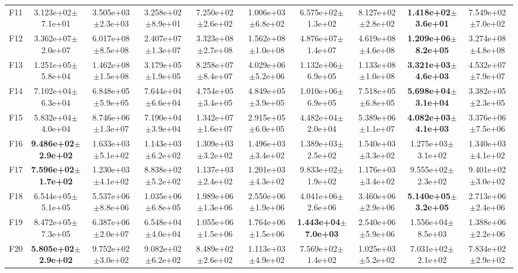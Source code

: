 \begin{table}[t]
\begin{tabular}{cccccccccc}
F11 & 3.123e+02$\pm$7.1e+01 & 3.505e+03$\pm$2.3e+03 & 3.258e+02$\pm$8.9e+01 & 7.250e+02$\pm$2.6e+02 & 1.006e+03$\pm$6.8e+02 & 6.575e+02$\pm$1.3e+02 & 8.127e+02$\pm$2.8e+02 & \textbf{1.418e+02$\pm$3.6e+01} & 7.549e+02$\pm$7.0e+02 \\
F12 & 3.362e+07$\pm$2.0e+07 & 6.017e+08$\pm$8.5e+08 & 2.407e+07$\pm$1.3e+07 & 3.323e+08$\pm$2.7e+08 & 1.562e+08$\pm$1.0e+08 & 4.876e+07$\pm$1.4e+07 & 4.619e+08$\pm$4.6e+08 & \textbf{1.209e+06$\pm$8.2e+05} & 3.274e+08$\pm$4.8e+08 \\
F13 & 1.251e+05$\pm$5.8e+04 & 1.462e+08$\pm$1.5e+08 & 3.179e+05$\pm$1.9e+05 & 8.258e+07$\pm$8.4e+07 & 4.029e+06$\pm$5.2e+06 & 1.132e+06$\pm$6.9e+05 & 1.133e+08$\pm$1.0e+08 & \textbf{3.321e+03$\pm$4.6e+03} & 4.532e+07$\pm$7.9e+07 \\
F14 & 7.102e+04$\pm$6.3e+04 & 6.848e+05$\pm$5.9e+05 & 7.644e+04$\pm$6.6e+04 & 4.754e+05$\pm$3.4e+05 & 4.849e+05$\pm$3.9e+05 & 1.010e+06$\pm$6.9e+05 & 7.518e+05$\pm$6.8e+05 & \textbf{5.698e+04$\pm$3.1e+04} & 3.382e+05$\pm$2.3e+05 \\
F15 & 5.832e+04$\pm$4.0e+04 & 8.746e+06$\pm$1.3e+07 & 7.190e+04$\pm$3.9e+04 & 1.342e+07$\pm$1.6e+07 & 2.915e+05$\pm$6.0e+05 & 4.482e+04$\pm$2.0e+04 & 5.389e+06$\pm$1.1e+07 & \textbf{4.082e+03$\pm$4.1e+03} & 3.376e+06$\pm$7.5e+06 \\
F16 & \textbf{9.486e+02$\pm$2.9e+02} & 1.633e+03$\pm$5.1e+02 & 1.143e+03$\pm$6.2e+02 & 1.309e+03$\pm$3.2e+02 & 1.496e+03$\pm$3.4e+02 & 1.389e+03$\pm$2.5e+02 & 1.540e+03$\pm$3.3e+02 & 1.275e+03$\pm$3.1e+02 & 1.340e+03$\pm$4.1e+02 \\
F17 & \textbf{7.596e+02$\pm$1.7e+02} & 1.230e+03$\pm$4.1e+02 & 8.838e+02$\pm$5.2e+02 & 1.137e+03$\pm$2.4e+02 & 1.201e+03$\pm$4.3e+02 & 9.833e+02$\pm$1.9e+02 & 1.176e+03$\pm$3.4e+02 & 9.555e+02$\pm$2.3e+02 & 9.401e+02$\pm$3.0e+02 \\
F18 & 6.544e+05$\pm$5.1e+05 & 5.537e+06$\pm$8.8e+06 & 1.035e+06$\pm$6.8e+05 & 1.989e+06$\pm$1.3e+06 & 2.550e+06$\pm$1.9e+06 & 4.041e+06$\pm$2.6e+06 & 3.460e+06$\pm$2.9e+06 & \textbf{5.140e+05$\pm$3.2e+05} & 2.713e+06$\pm$2.4e+06 \\
F19 & 8.472e+05$\pm$7.3e+05 & 6.387e+06$\pm$2.0e+07 & 6.548e+04$\pm$4.0e+04 & 1.055e+06$\pm$1.5e+06 & 1.764e+06$\pm$1.5e+06 & \textbf{1.443e+04$\pm$7.0e+03} & 2.540e+06$\pm$5.9e+06 & 1.556e+04$\pm$8.5e+03 & 1.388e+06$\pm$2.2e+06 \\
F20 & \textbf{5.805e+02$\pm$2.9e+02} & 9.752e+02$\pm$3.0e+02 & 9.082e+02$\pm$6.2e+02 & 8.489e+02$\pm$2.6e+02 & 1.113e+03$\pm$4.9e+02 & 7.569e+02$\pm$1.4e+02 & 1.025e+03$\pm$5.2e+02 & 7.031e+02$\pm$2.1e+02 & 7.834e+02$\pm$2.9e+02 \\

\end{tabular}
\end{table}
